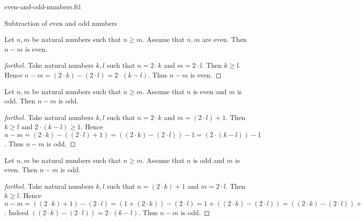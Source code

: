\documentclass{naproche-library}
\begin{document}
\begin{smodule}[title=Even and Odd Numbers]{even-and-odd-numbers.ftl}
\begin{sfragment}{Subtraction of even and odd numbers}
  \begin{proposition}[forthel,id=ARITHMETIC_15_8748569852145203]
    Let $n, m$ be natural numbers such that $n \geq m$.
    Assume that $n, m$ are even.
    Then $n - m$ is even.
  \end{proposition}
  \begin{proof}[forthel]
    Take natural numbers $k, l$ such that $n = 2 \cdot k$ and $m = 2 \cdot l$.
    Then $k \geq l$.
    Hence $n - m
      = (2 \cdot k) - (2 \cdot l)
      = 2 \cdot (k - l)$.
    Thus $n - m$ is even.
  \end{proof}

  \begin{proposition}[forthel,id=ARITHMETIC_15_0125412036589958]
    Let $n, m$ be natural numbers such that $n \geq m$.
    Assume that $n$ is even and $m$ is odd.
    Then $n - m$ is odd.
  \end{proposition}
  \begin{proof}[forthel]
    Take natural numbers $k, l$ such that $n = 2 \cdot k$ and $m = (2 \cdot l) + 1$.
    Then $k \geq l$ and $2 \cdot (k - l) \geq 1$.
    Hence $n - m
      = (2 \cdot k) - ((2 \cdot l) + 1)
      = ((2 \cdot k) - (2 \cdot l)) - 1
      = (2 \cdot (k - l)) - 1$.
    Thus $n - m$ is odd.
  \end{proof}

  \begin{corollary}[forthel,id=ARITHMETIC_15_1021458745896523]
    Let $n, m$ be natural numbers such that $n \geq m$.
    Assume that $n$ is odd and $m$ is even.
    Then $n - m$ is odd.
  \end{corollary}
  \begin{proof}[forthel]
    Take natural numbers $k, l$ such that $n = (2 \cdot k) + 1$ and $m = 2 \cdot l$.
    Then $k \geq l$.
    Hence $n - m
      = ((2 \cdot k) + 1) - (2 \cdot l)
      = (1 + (2 \cdot k)) - (2 \cdot l)
      = 1 + ((2 \cdot k) - (2 \cdot l))
      = ((2 \cdot k) - (2 \cdot l)) + 1
      = (2 \cdot (k - l)) + 1$.
    Indeed $((2 \cdot k) - (2 \cdot l)) = 2 \cdot (k - l)$. %
    Thus $n - m$ is odd.
  \end{proof}


\end{sfragment}
\end{smodule}
\end{document}
